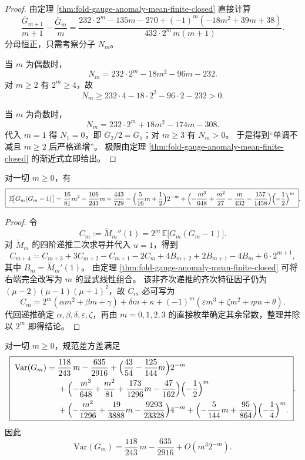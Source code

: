 \begin{proof}
由定理 \ref{thm:fold-gauge-anomaly-mean-finite-closed} 直接计算
\[
\frac{\bar G_{m+1}}{m+1}-\frac{\bar G_m}{m}
=
\frac{
232\cdot 2^m-135m-270+(-1)^m(-18m^2+39m+38)
}{
432\cdot 2^m\,m(m+1)
}.
\]
分母恒正，只需考察分子 \(N_m\)。

当 \(m\) 为偶数时，
\[
N_m=232\cdot 2^m-18m^2-96m-232.
\]
对 \(m\ge 2\) 有 \(2^m\ge 4\)，故
\[
N_m\ge 232\cdot 4-18\cdot 2^2-96\cdot 2-232>0.
\]

当 \(m\) 为奇数时，
\[
N_m=232\cdot 2^m+18m^2-174m-308.
\]
代入 \(m=1\) 得 \(N_1=0\)，即 \(\bar G_2/2=\bar G_1\)；对 \(m\ge 3\) 有 \(N_m>0\)。
于是得到“单调不减且 \(m\ge 2\) 后严格递增”。
极限由定理 \ref{thm:fold-gauge-anomaly-mean-finite-closed} 的渐近式立即给出。
\end{proof}

\begin{theorem}[二阶阶乘矩的精确闭式]\label{thm:fold-gauge-anomaly-second-factorial-finite-closed}
对一切 \(m\ge 0\)，有
\[
\boxed{\;
\mathbb E\!\bigl[G_m(G_m-1)\bigr]
=\frac{16}{81}m^2-\frac{106}{243}m+\frac{443}{729}
-\Bigl(\frac{5}{16}m+\frac12\Bigr)2^{-m}
+\Bigl(-\frac{m^3}{648}+\frac{m^2}{27}-\frac{m}{432}-\frac{157}{1458}\Bigr)\Bigl(-\frac12\Bigr)^m
\; }.
\]
\end{theorem}

\begin{proof}
令
\[
C_m:=\widetilde M_m''(1)=2^m\,\mathbb E\!\bigl[G_m(G_m-1)\bigr].
\]
对 \(\widetilde M_m\) 的四阶递推二次求导并代入 \(u=1\)，得到
\[
C_{m+4}=C_{m+3}+3C_{m+2}-C_{m+1}-2C_m
+4B_{m+2}+2B_{m+1}-4B_m+6\cdot 2^{m+1},
\]
其中 \(B_m=\widetilde M_m'(1)\)。
由定理 \ref{thm:fold-gauge-anomaly-mean-finite-closed} 可将右端完全改写为 \(m\) 的显式线性组合。
该非齐次递推的齐次特征因子仍为 \((\mu-2)(\mu-1)(\mu+1)^2\)，故 \(C_m\) 必可写为
\[
C_m
=2^m(\alpha m^2+\beta m+\gamma)
+\delta m+\kappa
+(-1)^m(\varepsilon m^3+\zeta m^2+\eta m+\theta).
\]
代回递推确定 \(\alpha,\beta,\delta,\varepsilon,\zeta\)，再由 \(m=0,1,2,3\) 的直接枚举确定其余常数，整理并除以 \(2^m\) 即得结论。
\end{proof}


\begin{theorem}[方差的精确有限长度闭式]\label{thm:fold-gauge-anomaly-variance-finite-window-closed}
对一切 \(m\ge 0\)，规范差方差满足
\[
\boxed{\;
\begin{aligned}
\mathrm{Var}(G_m)
={}&\frac{118}{243}\,m-\frac{635}{2916}
+\Bigl(\frac{43}{54}-\frac{125}{144}m\Bigr)2^{-m}\\
&+\Bigl(-\frac{m^3}{648}+\frac{m^2}{81}+\frac{173}{1296}m-\frac{47}{162}\Bigr)\Bigl(-\frac12\Bigr)^m\\
&+\Bigl(-\frac{m^2}{1296}+\frac{19}{3888}m-\frac{9293}{23328}\Bigr)4^{-m}
+\Bigl(-\frac{5}{144}m+\frac{95}{864}\Bigr)\Bigl(-\frac14\Bigr)^m.
\end{aligned}
\; }.
\]
因此
\[
\mathrm{Var}(G_m)=\frac{118}{243}\,m-\frac{635}{2916}+O(m^3 2^{-m}).
\]
\end{theorem}

